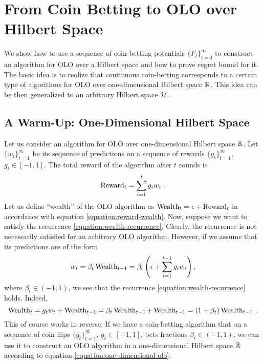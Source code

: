 \section{From Coin Betting to OLO over Hilbert Space}
\label{section:reduction_hilbert}

We show how to use a sequence of coin-betting potentials $\{F_t\}_{t=0}^\infty$
to construct an algorithm for \ac{OLO} over a Hilbert space
and how to prove regret bound for it. The basic idea is to realize that
continuous coin-betting corresponds to a certain type of algorithms
for \ac{OLO} over one-dimensional Hilbert space $\mathbb{R}$.
This idea can be then generalized to an arbitrary Hilbert space $\mathcal{H}$.

\subsection{A Warm-Up: One-Dimensional Hilbert Space}
\label{section:one-dimensional-hilbert-space-olo}

Let us consider an algorithm for OLO over one-dimensional Hilbert space $\mathbb{R}$.
Let $\{w_t\}_{t=1}^\infty$ be its sequence of predictions on a sequence of
rewards $\{g_t\}_{t=1}^\infty$, $g_t \in [-1,1]$. The total reward of the
algorithm after $t$ rounds is
$$
\operatorname{Reward}_t = \sum_{i=1}^t g_i w_i \; .
$$
Let us define ``wealth'' of the OLO algorithm as $\operatorname{Wealth}_t = \epsilon +
\operatorname{Reward}_t$ in accordance with equation
\eqref{equation:reward-wealth}. Now, suppose we want to satisfy the recurrence
\eqref{equation:wealth-recurrence}. Clearly, the recurrence is not necessarily
satisfied for an arbitrary OLO algorithm. However, if we assume that its
predictions are of the form \begin{equation}
\label{equation:one-dimensional-olo}
w_t = \beta_t \operatorname{Wealth}_{t-1}
= \beta_t \left(\epsilon+ \sum_{i=1}^{t-1} g_i w_i \right),
\end{equation}
where $\beta_t \in (-1,1)$, we see that the recurrence
\eqref{equation:wealth-recurrence} holds. Indeed,
$$
\operatorname{Wealth}_t
= g_t w_t + \operatorname{Wealth}_{t-1}
= \beta_t \operatorname{Wealth}_{t-1} + \operatorname{Wealth}_{t-1}
= (1+\beta_t) \operatorname{Wealth}_{t-1} \; .
$$
This of course works in reverse: If we have a coin-betting algorithm that on a
sequence of coin flips $\{g_t\}_{t=1}^\infty$, $g_t \in [-1,1]$, bets fractions
$\beta_t \in (-1,1)$, we can use it to construct an OLO algorithm in a
one-dimensional Hilbert space $\mathbb{R}$ according to equation
\eqref{equation:one-dimensional-olo}.


